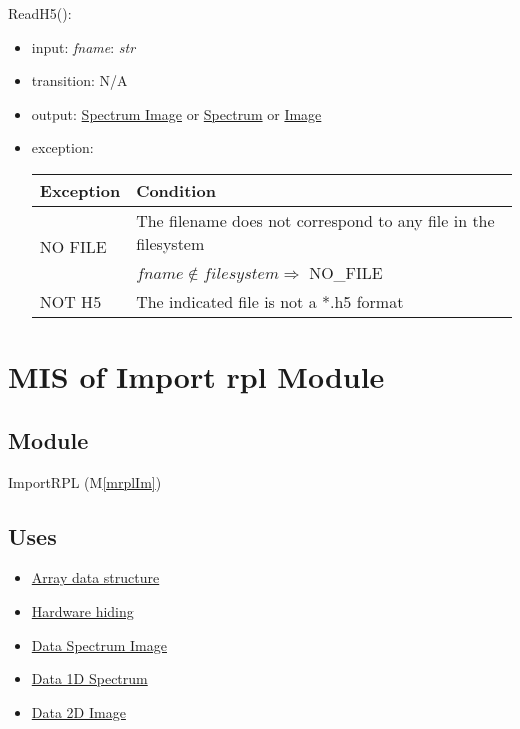 \documentclass[12pt, titlepage]{article}
\newcommand{\mref}[1]{M\ref{#1}}
\begin{document}
\noindent ReadH5():
\begin{itemize}
    \item input: \textit{fname}: \textit{str}
    \item transition: N/A
    \item output: \hyperref[Mod:SI]{Spectrum Image} or
    \hyperref[Mod:Spectrum]{Spectrum} or \hyperref[Mod:Image]{Image}
    \item exception: 
    \begin{center}
        \begin{tabular}{p{3cm} p{12cm}}
            \toprule[0.15em]
            \textbf{Exception} & \textbf{Condition}\\
            \midrule[0.1em]
            \multirow{2}{0.25\textwidth}{NO FILE} & The filename does not
            correspond to any file in the filesystem\\ 
            & $fname \notin filesystem \Rightarrow$ NO\_FILE\\ 
            \midrule[0.05em]
            NOT H5 & The indicated file is not a *.h5 format\\
            \bottomrule[0.15em]
        \end{tabular}
    \end{center}
\end{itemize}

\section{MIS of Import rpl Module} \label{Mod:ImportRPL}

\subsection{Module}

ImportRPL (\mref{mrplIm})

\subsection{Uses}
\begin{itemize}
    \item \hyperref[Mod:Array]{Array data structure}
    \item \hyperref[Mod:HH]{Hardware hiding}
    \item \hyperref[Mod:SI]{Data Spectrum Image}
    \item \hyperref[Mod:Spectrum]{Data 1D Spectrum}
    \item \hyperref[Mod:Image]{Data 2D Image}
\end{itemize}
\end{document}
